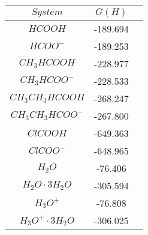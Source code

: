 \begin{tabular}{|c|c|c|}
       \hline
       $System$                              & $G (H)$  \\ \hline
       $HCOOH$                               & -189.694 \\ \hline
       $HCOO^-$                              & -189.253 \\ \hline
       $CH_3HCOOH$                           & -228.977 \\ \hline
       $CH_3HCOO^-$                          & -228.533 \\ \hline
       $CH_3CH_3HCOOH$                       & -268.247 \\ \hline
       $CH_3CH_3HCOO^-$                      & -267.800 \\ \hline
       $ClCOOH$                              & -649.363 \\ \hline
       $ClCOO^-$                             & -648.965 \\ \hline
       $H_2O$                                & -76.406  \\ \hline
       $H_2O\cdot 3 H_2O$                    & -305.594 \\ \hline
       $H_3O^+$                              & -76.808  \\ \hline
       $H_3O^+\cdot 3 H_2O$                  & -306.025 \\ \hline
\end{tabular}